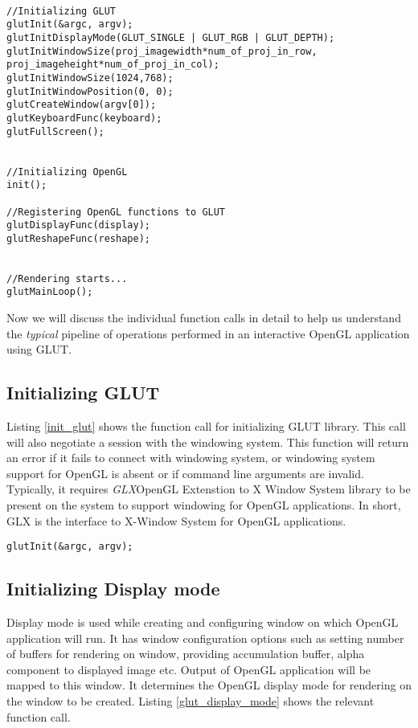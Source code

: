 \documentclass{article}
\begin{document}
\begin{lstlisting}[label=main_func,caption=Typical structure of GLUT based OpenGL application]

//Initializing GLUT 
glutInit(&argc, argv);
glutInitDisplayMode(GLUT_SINGLE | GLUT_RGB | GLUT_DEPTH);
glutInitWindowSize(proj_imagewidth*num_of_proj_in_row,        proj_imageheight*num_of_proj_in_col);
glutInitWindowSize(1024,768);
glutInitWindowPosition(0, 0);
glutCreateWindow(argv[0]);
glutKeyboardFunc(keyboard);
glutFullScreen();


//Initializing OpenGL
init();

//Registering OpenGL functions to GLUT 
glutDisplayFunc(display);
glutReshapeFunc(reshape);


//Rendering starts...
glutMainLoop();

\end{lstlisting}

Now we will discuss the individual function calls in detail to help us understand the \textit{typical} pipeline of operations performed in an interactive OpenGL application using GLUT.

\subsection{Initializing GLUT}
Listing \ref{init_glut} shows the function call for initializing GLUT library. This call will also negotiate a session with the windowing system. This function will return an error if it fails to connect with windowing system, or windowing system support for OpenGL is absent or if command line arguments are invalid. Typically, it requires \textit{GLX}{OpenGL Extenstion to X Window System} library to be present on the system to support windowing for OpenGL applications. In short, GLX is the interface to X-Window System for OpenGL applications. 
\begin{lstlisting}[label=init_glut,caption=Initializing GLUT]
glutInit(&argc, argv);
\end{lstlisting}

\subsection{Initializing Display mode}
Display mode is used while creating and configuring window on which OpenGL application will run. It has window configuration options such as setting number of buffers for rendering on window, providing accumulation buffer, alpha component to displayed image etc. Output of OpenGL application will be mapped to this window. It determines the OpenGL display mode for rendering on the window to be created. Listing \ref{glut_display_mode} shows the relevant function call.
\end{document}
